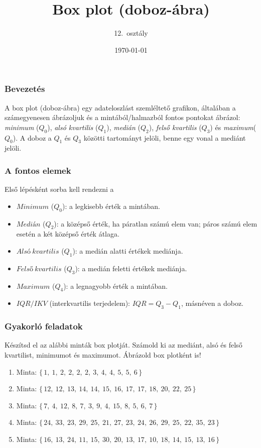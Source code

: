 \documentclass[12pt,a4paper]{article}
\title{Box plot (doboz-ábra)}
\author{12.\ osztály}
\date{\today}
\begin{document}
\maketitle

\subsubsection*{Bevezetés}
\noindent A box plot (doboz-ábra) egy adat\-eloszlást szemléltető grafikon, általában a számegyenesen ábrázoljuk és a mintából/halmazból fontos pontokat ábrázol:
\emph{minimum} ($Q_0$), \emph{alsó kvartilis} ($Q_1$), \emph{medián} ($Q_2$), \emph{felső kvartilis} ($Q_3$) és \emph{maximum}($Q_0$). 
A doboz a $Q_1$ és $Q_3$ közötti tartományt jelöli, benne egy vonal a mediánt jelöli. 
\\

\subsubsection*{A fontos elemek}
\noindent Első lépésként sorba kell rendezni a 
\begin{itemize}
  \item $Minimum$ ($Q_0$): a legkisebb érték a mintában.
  \item $Medián$ ($Q_2$): a középső érték, ha páratlan számú elem van; 
  páros számú elem esetén a két középső érték átlaga.
  \item $Alsó\ kvartilis$ ($Q_1$): a medián alatti értékek mediánja.
  \item $Felső\ kvartilis$ ($Q_3$): a medián feletti értékek mediánja.
  \item $Maximum$ ($Q_4$): a legnagyobb érték a mintában.
  \item $IQR / IKV$ (interkvartilis terjedelem): $IQR = Q_3 - Q_1$, másnéven a doboz.
\end{itemize}

\subsubsection*{Gyakorló feladatok}
\noindent Készítsd el az alábbi minták box plotját. 
Számold ki az mediánt, alsó és felső kvartilist, minimumot és maximumot. Ábrázold box plotként is!
\\
\begin{enumerate}[label=\alph*]
  \item \noindent Minta: $\{\,1,\ 1,\ 2,\ 2,\ 2,\ 2,\ 3,\ 4,\ 4,\ 5,\ 5,\ 6\,\}$
  \item \noindent Minta: $\{\,12,\ 12,\ 13,\ 14,\ 14,\ 15,\ 16,\ 17,\ 17,\ 18,\ 20,\ 22,\ 25\,\}$
  \item \noindent Minta: $\{\,7,\ 4,\ 12,\ 8,\ 7,\ 3,\ 9,\ 4,\ 15,\ 8,\ 5,\ 6,\ 7\,\}$
  \item \noindent Minta: $\{\,24,\ 33,\ 23,\ 29,\ 25,\ 21,\ 27,\ 23,\ 24,\ 26,\ 29,\ 25,\ 22,\ 35,\ 23\,\}$
  \item \noindent Minta: $\{\,16,\ 13,\ 24,\ 11,\ 15,\ 30,\ 20,\ 13,\ 17,\ 10,\ 18,\ 14,\ 15,\ 13,\ 16\,\}$
\end{enumerate}
\end{document}
